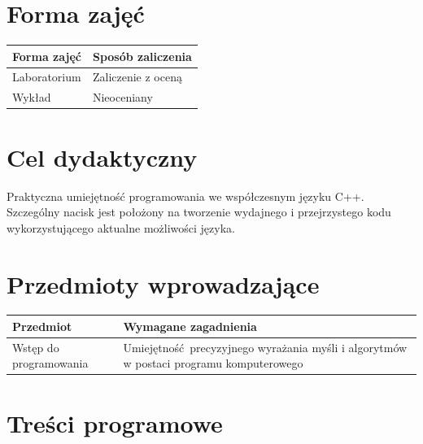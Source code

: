 \documentclass[12pt, a4paper]{article}
\begin{document}
\section{Forma zajęć}

\begin{tabular}{ll}
  \hline
  \textbf{Forma zajęć} & \textbf{Sposób zaliczenia} \\
  \hline
  Laboratorium & Zaliczenie z oceną \\
  Wykład & Nieoceniany \\
  \hline
\end{tabular}

\section{Cel dydaktyczny}

Praktyczna umiejętność programowania we współczesnym języku C++. Szczególny nacisk jest położony na tworzenie wydajnego i przejrzystego kodu wykorzystującego aktualne możliwości języka.

\section{Przedmioty wprowadzające}

\begin{tabularx}{\textwidth}{lX}
  \hline
  \textbf{Przedmiot} & \textbf{Wymagane zagadnienia} \\
  \hline
  Wstęp do programowania & Umiejętność precyzyjnego wyrażania myśli i algorytmów w postaci programu komputerowego \\
  \hline
\end{tabularx}

\section{Treści programowe}
\end{document}
